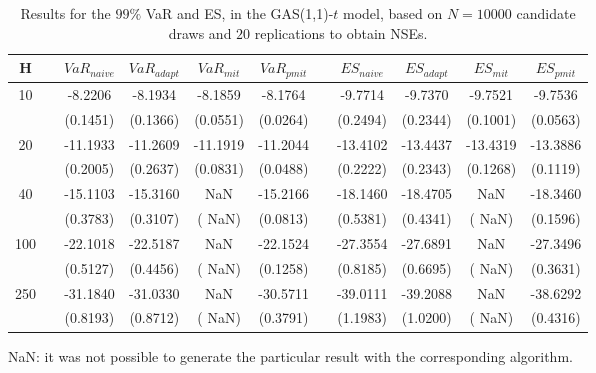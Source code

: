 \begin{table}[h] 
\centering 
\caption{Results for the $99\%$ VaR and ES, in the GAS(1,1)-$t$ model, based on $N=10000$ candidate draws and $20$ replications to obtain NSEs.} 
\label{tab:res_algos_t_gas} 
\begin{tabular}{ccccccccccc}  
 H & & $VaR_{naive}$ & $VaR_{adapt}$ & $VaR_{mit}$  & $VaR_{pmit}$ &  & $ES_{naive}$ & $ES_{adapt}$ & $ES_{mit}$ & $ES_{pmit}$ \\ \hline 
10 & & -8.2206 & -8.1934 & -8.1859 & -8.1764 & & -9.7714 & -9.7370 & -9.7521 & -9.7536  \\ 
 & & (0.1451) & (0.1366) & (0.0551) & (0.0264) & & (0.2494) & (0.2344) & (0.1001) & (0.0563)   \\ [1ex] 
20 & & -11.1933 & -11.2609 & -11.1919 & -11.2044 & & -13.4102 & -13.4437 & -13.4319 & -13.3886  \\ 
 & & (0.2005) & (0.2637) & (0.0831) & (0.0488) & & (0.2222) & (0.2343) & (0.1268) & (0.1119)   \\ [1ex] 
40 & & -15.1103 & -15.3160 &    NaN & -15.2166 & & -18.1460 & -18.4705 &    NaN & -18.3460  \\ 
 & & (0.3783) & (0.3107) & (   NaN) & (0.0813) & & (0.5381) & (0.4341) & (   NaN) & (0.1596)   \\ [1ex] 
100 & & -22.1018 & -22.5187 &    NaN & -22.1524 & & -27.3554 & -27.6891 &    NaN & -27.3496  \\ 
 & & (0.5127) & (0.4456) & (   NaN) & (0.1258) & & (0.8185) & (0.6695) & (   NaN) & (0.3631)   \\ [1ex] 
250 & & -31.1840 & -31.0330 &    NaN & -30.5711 & & -39.0111 & -39.2088 &    NaN & -38.6292  \\ 
 & & (0.8193) & (0.8712) & (   NaN) & (0.3791) & & (1.1983) & (1.0200) & (   NaN) & (0.4316)   \\ [1ex] 
\hline 
\end{tabular} 
\raggedright 

\vspace{5pt}\footnotesize{NaN: it was not possible to generate the particular result with the corresponding algorithm.} 
\end{table} 
